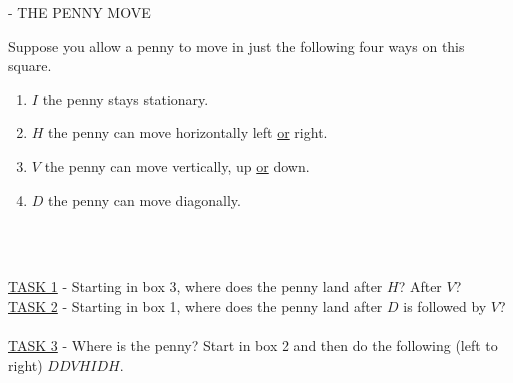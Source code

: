 \documentclass[12pt]{book}
\theoremstyle{definition}
\begin{document}
 - THE PENNY MOVE
\begin{multicols}{2}
	Suppose you allow a penny to move in just the following four ways on this square.
	\begin{enumerate}
		\item $I$ the penny stays stationary.
		
		\item $H$ the penny can move horizontally left \underline{or} right.
		
		\item $V$ the penny can move vertically, up \underline{or} down.
		
		\item $D$ the penny can move diagonally. 
		
	\end{enumerate}
	\columnbreak
	\begin{flushright}
		~\\
		~\\
		
	\end{flushright}
	
\end{multicols}

\underline{TASK 1} - Starting in box 3, where does the penny land after $ H $? After $ V $?
~\\


\underline{TASK 2} - Starting in box 1, where does the penny land after $ D $ is followed by $ V $?
~\\

\underline{TASK 3} - Where is the penny? Start in box 2 and then do the following (left to right) $ D D V H I D H $.

~\\
\end{document}
